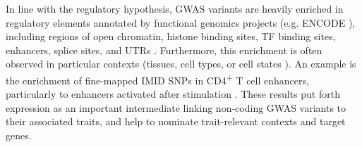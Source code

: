 \begin{outline}
In line with the regulatory hypothesis, \gls{GWAS} variants are heavily enriched in regulatory elements annotated by functional genomics projects (e.g. ENCODE \autocite{theencodeprojectconsortium2012IntegratedEncyclopediaDNA}), including
    regions of open chromatin, 
    histone binding sites, 
    \gls{TF} binding sites,
    enhancers,
    splice sites,
    and \glspl{UTR}
    \autocite{schaub2012LinkingDiseaseAssociations,maurano2012SystematicLocalizationCommon,farh2015GeneticEpigeneticFine,trynka2015DisentanglingEffectsColocalizing,nasser2020GenomewideMapsEnhancer}.
Furthermore, this enrichment is often observed in particular contexts (tissues, cell types, or cell states \autocite{visscher201710YearsGWAS,gallagher2018PostGWASEraAssociation,cano-gamez2020GWASFunctionUsing}).
An example is the enrichment of fine-mapped \gls{IMID} \glspl{SNP} in CD4\textsuperscript{+} T cell enhancers, particularly to enhancers activated after stimulation \autocite{farh2015GeneticEpigeneticFine}.
These results put forth expression as an important intermediate linking non-coding \gls{GWAS} variants to their associated traits, 
and help to nominate trait-relevant contexts and target genes.


\end{outline}
